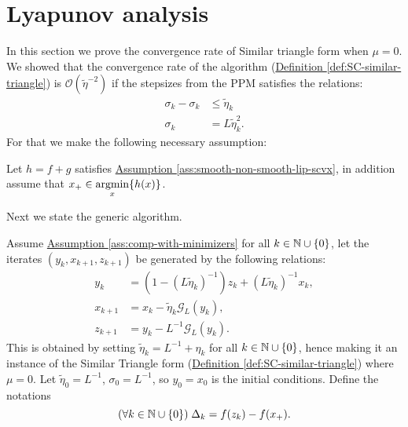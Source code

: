 \documentclass[12pt]{article}
\begin{document}
        
\section{Lyapunov analysis}\label{sec:lyapunov-analysis}

    In this section we prove the convergence rate of Similar triangle form when $\mu = 0$. 
    We showed that the convergence rate of the algorithm 
    (\hyperref[def:SC-similar-triangle]{Definition \ref*{def:SC-similar-triangle}})
    is $\mathcal O(\tilde \eta ^{-2})$ if the stepsizes from the PPM satisfies the relations: 
    \begin{align*}
        \sigma_{k} - \sigma_{k} &\le \tilde\eta_k
        \\
        \sigma_k &= L \tilde \eta_k^2. 
    \end{align*}
    For that we make the following necessary assumption: 
    \begin{assumption}\label{ass:comp-with-minimizers}
        Let $h = f + g$ satisfies 
        \hyperref[ass:smooth-non-smooth-lip-scvx]
        {Assumption \ref*{ass:smooth-non-smooth-lip-scvx}}, 
        in addition assume that $x_+ \in \mathop{\rm argmin}\limits_x \{h(x)\}$. 
    \end{assumption}
    Next we state the generic algorithm. 
    \begin{definition}
        \label{def:similar-triangle-to-prove}
        Assume
        \hyperref[ass:comp-with-minimizers]
        {Assumption \ref*{ass:comp-with-minimizers}}
        for all $k\in \mathbb N \cup \{0\}$, let the iterates $(y_k, x_{k + 1}, z_{k +1})$ be generated by the following relations: 
        \begin{align}
            y_k &= (1 - (L\tilde \eta_k)^{-1}) z_k + (L\tilde \eta_k)^{-1} x_k, 
            \\
            x_{k + 1} &= x_k - \tilde \eta_k \mathcal G_L(y_k), 
            \\
            z_{k + 1} &= y_k - L^{-1} \mathcal G_L(y_k). 
            \label{eqn:similar-triangle-to-prove}
        \end{align}
        This is obtained by setting $\tilde \eta_k = L^{-1} + \eta_k$ for all $k \in \mathbb N\cup \{0\}$, hence making it an instance of the Similar Triangle form 
        (\hyperref[def:SC-similar-triangle]
            {Definition \ref*{def:SC-similar-triangle}}) 
        where $\mu =0$. 
        Let $\tilde \eta_0 = L^{-1}$, $\sigma_0 = L^{-1}$, so $y_0 = x_0$ is the initial conditions. 
        Define the notations 
        $$
            (\forall k \in \mathbb N \cup \{0\})\; \Delta_k = f(z_k) - f(x_+). 
        $$
    \end{definition}
    
\end{document}
